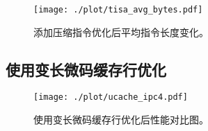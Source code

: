 \begin{figure}[!htbp]
  \centering
  \texttt{[image: ./plot/tisa\_avg\_bytes.pdf]}
  \caption{添加压缩指令优化后平均指令长度变化。}
  \label{img:avg_bytes}
\end{figure}

\subsection{使用变长微码缓存行优化}

\begin{figure}[!htbp]
  \centering
  \texttt{[image: ./plot/ucache\_ipc4.pdf]}
  \caption{使用变长微码缓存行优化后性能对比图。}
  \label{img:ipc4}
\end{figure}